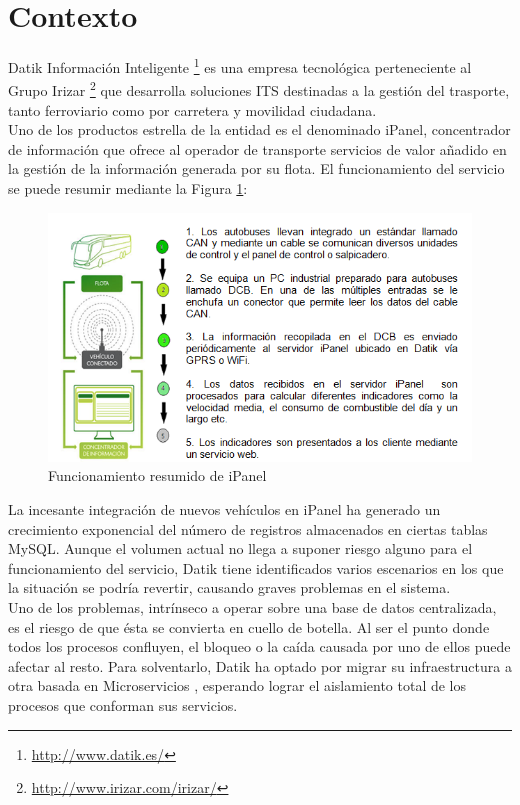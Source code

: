 \section{Contexto}
 
Datik Información Inteligente \footnote{\url{http://www.datik.es/}} es una empresa tecnológica perteneciente al Grupo Irizar \footnote{\url{http://www.irizar.com/irizar/}}  que desarrolla soluciones ITS destinadas a la gestión del trasporte, tanto ferroviario como por carretera y movilidad ciudadana.\\

Uno de los productos estrella de la entidad es el denominado iPanel, concentrador de  información que ofrece al operador de transporte servicios de valor añadido en la gestión de la información generada por su flota. El funcionamiento del servicio se puede resumir mediante la Figura \ref{fig:ipanel}:\\

\begin{figure}[h]
	\centering
	\includegraphics[width=1\textwidth]{Ilustraciones/ipanel_infraesctructure.png}
	\caption{Funcionamiento resumido de iPanel}
	\label{fig:ipanel}
\end{figure}

La incesante integración de nuevos vehículos en iPanel ha generado un crecimiento exponencial del número de registros almacenados en ciertas tablas MySQL. Aunque el volumen actual no llega a suponer riesgo alguno para el funcionamiento del servicio, Datik tiene identificados varios escenarios en los que la situación se podría revertir, causando graves problemas en el sistema.\\

Uno de los problemas, intrínseco a operar sobre una base de datos centralizada, es el riesgo de que ésta se convierta en cuello de botella. Al ser el punto donde todos los procesos confluyen, el bloqueo o la caída causada por uno de ellos puede afectar al resto. Para solventarlo, Datik ha optado por migrar su infraestructura a otra basada en Microservicios \cite{newman2015building}, esperando lograr el aislamiento total de los procesos que conforman sus servicios.\\ 

